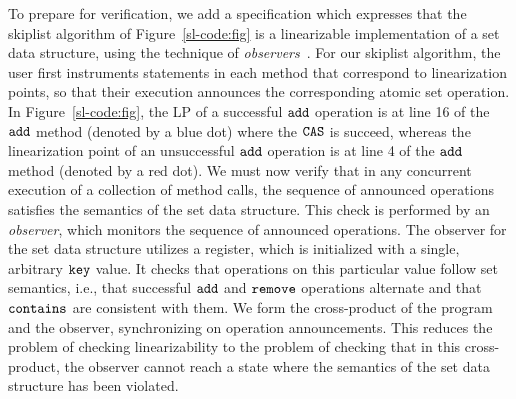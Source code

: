 To prepare for verification, we add a specification which expresses that
the skiplist algorithm of Figure~\ref{sl-code:fig} is a
linearizable implementation of a set data structure, using
the technique of
{\em observers}~\cite{AHHR:integrated,BEEH:icalp15,HSV:concur13,Quy:sas16}.
For our skiplist algorithm, the user first instruments statements in each
method that correspond to linearization points, so that their execution
announces the corresponding atomic set operation.
In Figure~\ref{sl-code:fig}, the LP of a successful ${\tt add}$ operation is at line 16 of the $\tt add$ method (denoted by a blue dot) where the $\tt CAS$ is succeed, whereas the linearization point of an unsuccessful $\tt add$ operation is at line 4 of the $\tt add$
method (denoted by a red dot).
We must now verify that in any concurrent
execution of a collection of method calls, the sequence of announced
operations satisfies the semantics of the set data structure.
This check is performed by an {\em observer}, which
monitors the sequence of announced operations. The observer for the set
data structure utilizes a register, which is initialized with
a single, arbitrary $\tt key$ value.
It checks that operations on this particular value follow set semantics,
i.e., that successful $\tt add$ and $\tt remove$ operations alternate and that
$\tt contains$ are consistent with them.
We form %
the cross-product of the program  and the observer, synchronizing on
operation announcements. This reduces the
problem of checking linearizability to the problem of checking that
in this cross-product, the observer cannot reach a state where
the semantics of the set data structure has been violated.




